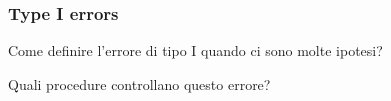 \documentclass[xcolor={pdftex,dvipsnames,table}]{beamer}
\newcommand{\bb}[1]{\begin{block}{#1}}
\newcommand{\eb}{\end{block}}
\newcommand{\bfr}[1]{\begin{frame} \frametitle{#1}}
\begin{document}
% 



\bfr{Type I errors}
    \bb{Come definire l'errore di tipo I quando ci sono molte ipotesi?}
\eb
       \bb{Quali procedure controllano questo errore?}
\eb
\end{frame}



\end{document}
